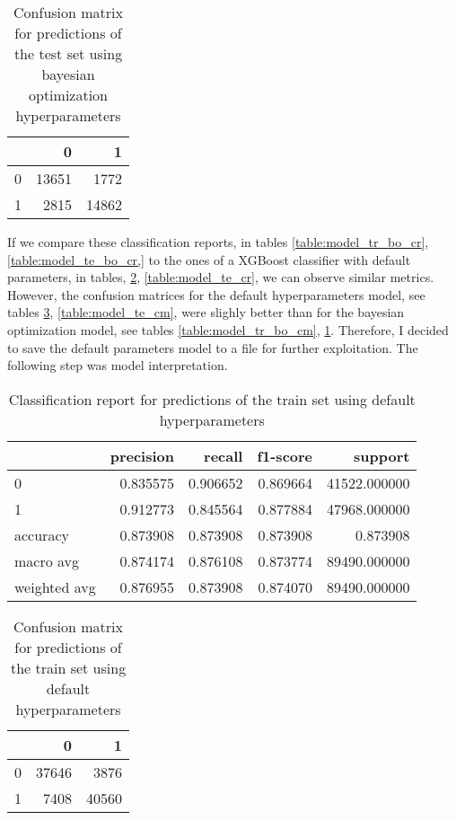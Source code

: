 \documentclass{article}
\begin{document}
{\begin{itemize}
\begin{table}[h!]
\centering
\begin{tabular}{lrr}
\toprule
{} &      0 &      1 \\
\midrule
0 &  13651 &   1772 \\
1 &   2815 &  14862 \\
\bottomrule
\end{tabular}
\caption{Confusion matrix for predictions of the test set using bayesian optimization hyperparameters}
\label{table:model_te_bo_cm}
\end{table}

If we compare these classification reports, in tables \ref{table:model_tr_bo_cr}, \ref{table:model_te_bo_cr,} to the ones of a XGBoost classifier with default parameters, in tables, \ref{table:model_tr_cr}, \ref{table:model_te_cr}, we can observe similar metrics. However, the confusion matrices for the default hyperparameters model, see tables \ref{table:model_tr_cm}, \ref{table:model_te_cm}, were slighly better than for the bayesian optimization model, see tables \ref{table:model_tr_bo_cm}, \ref{table:model_te_bo_cm}. Therefore, I decided to save the default parameters model to a file for further exploitation.  The following step was model interpretation.

\begin{table}[h!]
\centering
\begin{tabular}{lrrrr}
\toprule
{} &  precision &    recall &  f1-score &       support \\
\midrule
0            &   0.835575 &  0.906652 &  0.869664 &  41522.000000 \\
1            &   0.912773 &  0.845564 &  0.877884 &  47968.000000 \\
accuracy     &   0.873908 &  0.873908 &  0.873908 &      0.873908 \\
macro avg    &   0.874174 &  0.876108 &  0.873774 &  89490.000000 \\
weighted avg &   0.876955 &  0.873908 &  0.874070 &  89490.000000 \\
\bottomrule
\end{tabular}

\caption{Classification report for predictions of the train set using default hyperparameters}
\label{table:model_tr_cr}
\end{table}

\begin{table}[h!]
\centering
\begin{tabular}{lrr}
\toprule
{} &      0 &      1 \\
\midrule
0 &  37646 &   3876 \\
1 &   7408 &  40560 \\
\bottomrule
\end{tabular}
\caption{Confusion matrix for predictions of the train set using default hyperparameters}
\label{table:model_tr_cm}
\end{table}


\end{itemize}}
\end{document}
